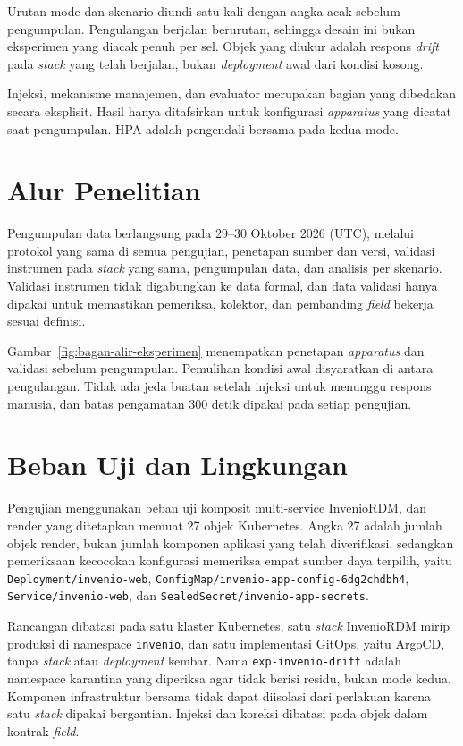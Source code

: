 Urutan mode dan skenario diundi satu kali dengan angka acak sebelum pengumpulan. Pengulangan berjalan berurutan, sehingga desain ini bukan eksperimen yang diacak penuh per sel. Objek yang diukur adalah respons \textit{drift} pada \textit{stack} yang telah berjalan, bukan \textit{deployment} awal dari kondisi kosong.

Injeksi, mekanisme manajemen, dan evaluator merupakan bagian yang dibedakan secara eksplisit. Hasil hanya ditafsirkan untuk konfigurasi \textit{apparatus} yang dicatat saat pengumpulan. HPA adalah pengendali bersama pada kedua mode.

\section{Alur Penelitian}

Pengumpulan data berlangsung pada 29--30 Oktober 2026 (UTC), melalui protokol yang sama di semua pengujian, penetapan sumber dan versi, validasi instrumen pada \textit{stack} yang sama, pengumpulan data, dan analisis per skenario. Validasi instrumen tidak digabungkan ke data formal, dan data validasi hanya dipakai untuk memastikan pemeriksa, kolektor, dan pembanding \textit{field} bekerja sesuai definisi.



Gambar~\ref{fig:bagan-alir-eksperimen} menempatkan penetapan \textit{apparatus} dan validasi sebelum pengumpulan. Pemulihan kondisi awal disyaratkan di antara pengulangan. Tidak ada jeda buatan setelah injeksi untuk menunggu respons manusia, dan batas pengamatan 300 detik dipakai pada setiap pengujian.

\section{Beban Uji dan Lingkungan}

Pengujian menggunakan beban uji komposit multi-service InvenioRDM, dan render yang ditetapkan memuat 27 objek Kubernetes. Angka 27 adalah jumlah objek render, bukan jumlah komponen aplikasi yang telah diverifikasi, sedangkan pemeriksaan kecocokan konfigurasi memeriksa empat sumber daya terpilih, yaitu \texttt{Deployment/invenio-web}, \texttt{ConfigMap/invenio-app-config-6dg2chdbh4}, \texttt{Service/invenio-web}, dan \texttt{SealedSecret/invenio-app-secrets}.

Rancangan dibatasi pada satu klaster Kubernetes, satu \textit{stack} InvenioRDM mirip produksi di namespace \texttt{invenio}, dan satu implementasi GitOps, yaitu ArgoCD, tanpa \textit{stack} atau \textit{deployment} kembar. Nama \texttt{exp-invenio-drift} adalah namespace karantina yang diperiksa agar tidak berisi residu, bukan mode kedua. Komponen infrastruktur bersama tidak dapat diisolasi dari perlakuan karena satu \textit{stack} dipakai bergantian. Injeksi dan koreksi dibatasi pada objek dalam kontrak \textit{field}.

